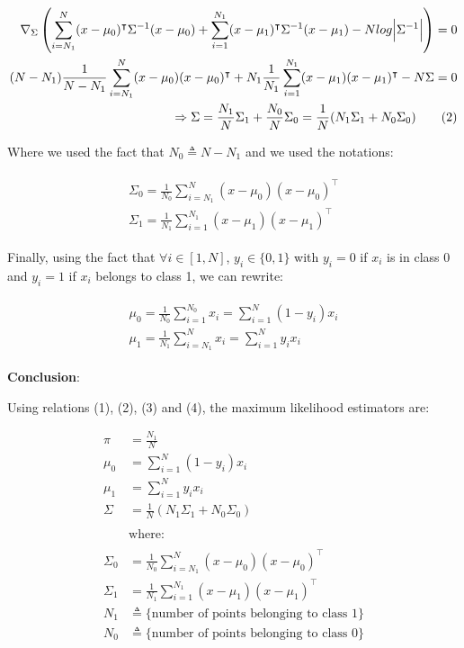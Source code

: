 \documentclass[11pt]{article}
\numberwithin{figure}{section} %
\begin{document}
\begin{align}
\nabla_{\Sigma} \left(\sum\limits_{i=N_1}^N (x- \mu_{0})^{\intercal}\Sigma^{-1}(x-\mu_{0}) 
+ \sum\limits_{i=1}^{N_1} (x- \mu_{1})^{\intercal}\Sigma^{-1}(x-\mu_{1}) -N log\abs{\Sigma^{-1}} \right) = 0 \nonumber \\
(N-N_1) \frac{1}{N-N_1} \sum\limits_{i=N_1}^N (x- \mu_{0})(x-\mu_{0})^{\intercal} + 
N_1 \frac{1}{N_1} \sum\limits_{i=1}^{N_1} (x- \mu_{1})(x-\mu_{1})^{\intercal} - N \Sigma = 0 \nonumber \\
\Rightarrow \Sigma = \frac{N_1}{N}\Sigma_1 + \frac{N_0}{N}\Sigma_{0} = \frac{1}{N}(N_1 \Sigma_1 + N_0 \Sigma_0) \tag{2}
\end{align}

Where we used the fact that $N_0 \triangleq N - N_1$ and we used the notations:

\begin{align}
\begin{split}
\Sigma_0 = \frac{1}{N_0} \sum\limits_{i=N_1}^{N} (x- \mu_{0})(x-\mu_{0})^{\intercal} \label{eq3} \\
\Sigma_1 = \frac{1}{N_1} \sum\limits_{i=1}^{N_1} (x- \mu_{1})(x-\mu_{1})^{\intercal}
\end{split}
\end{align}

Finally, using the fact that $\forall i \in [1,N]$, $y_i \in \{0, 1\}$ with $y_i = 0$ if $x_i$ is in class 0 and $y_i = 1$ if $x_i$ belongs to class 1, we can rewrite:

\begin{align}
\begin{split}
\mu_0 = \frac{1}{N_0} \sum\limits_{i=1}^{N_0} x_i = \sum\limits_{i=1}^{N} (1 - y_i) x_i \label{4} \\
\mu_1 = \frac{1}{N_1} \sum\limits_{i=N_1}^{N} x_i = \sum\limits_{i=1}^{N} y_i x_i
\end{split}
\end{align}

\textbf{Conclusion}:
\begin{tcolorbox}
Using relations (1), (2), (3) and (4), the maximum likelihood estimators are:

\begin{align*}
\pi & = \frac{N_1}{N} \\
\mu_0 & = \sum\limits_{i=1}^{N} (1 - y_i) x_i \\
\mu_1  & = \sum\limits_{i=1}^{N} y_i x_i \\
\Sigma & = \frac{1}{N}(N_1 \Sigma_1 + N_0 \Sigma_0) \\
\\
 & \text{where:} \\
\\
\Sigma_0 & = \frac{1}{N_0} \sum\limits_{i=N_1}^{N} (x- \mu_{0})(x-\mu_{0})^{\intercal} \\
\Sigma_1 & = \frac{1}{N_1} \sum\limits_{i=1}^{N_1} (x- \mu_{1})(x-\mu_{1})^{\intercal} \\
N_1 & \triangleq  \{\text{number of points belonging to class 1}\} \\
N_0 & \triangleq \{\text{number of points belonging to class 0}\}
\end{align*}

\end{tcolorbox}
\end{document}
